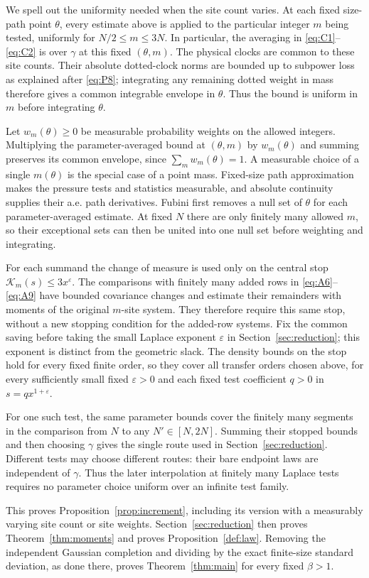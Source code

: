We spell out the uniformity needed when the site count varies.  At
each fixed size-path point \(\theta\), every estimate above is
applied to the particular integer \(m\) being tested, uniformly for
\(N/2\le m\le3N\).  In particular, the averaging in
\eqref{eq:C1}--\eqref{eq:C2} is over \(\gamma\) at this fixed
\((\theta,m)\).  The physical clocks are common to these site
counts.  Their absolute dotted-clock norms are bounded up to subpower
loss as explained after \eqref{eq:P8}; integrating any remaining
dotted weight in mass therefore gives a common integrable envelope
in \(\theta\).  Thus the bound is uniform in \(m\) before
integrating \(\theta\).

Let \(w_m(\theta)\ge0\) be measurable probability weights on the
allowed integers.  Multiplying the parameter-averaged bound at
\((\theta,m)\) by \(w_m(\theta)\) and summing preserves its
common envelope, since \(\sum_m w_m(\theta)=1\).  A measurable
choice of a single \(m(\theta)\) is the special case of a point
mass.  Fixed-size path approximation makes the pressure tests and
statistics measurable, and absolute continuity supplies their a.e.
path derivatives.  Fubini first removes a null set of \(\theta\)
for each parameter-averaged estimate.  At fixed \(N\) there are only
finitely many allowed \(m\), so their exceptional sets can then be
united into one null set before weighting and integrating.

For each summand the change of measure is used only on the central
stop \(\mathcal K_m(s)\le3x^\varepsilon\).  The comparisons with
finitely many added rows in \eqref{eq:A6}--\eqref{eq:A9} have bounded
covariance changes and estimate their remainders with moments of the
original \(m\)-site system.  They therefore require this same stop,
without a new stopping condition for the added-row systems.  Fix the
common saving before taking the small Laplace exponent
\(\varepsilon\) in Section~\ref{sec:reduction}; this exponent is
distinct from the geometric slack. The density bounds on the stop hold
for every fixed finite order, so they cover all transfer orders chosen
above, for every sufficiently small fixed \(\varepsilon>0\) and each
fixed test coefficient \(q>0\) in \(s=qx^{1+\varepsilon}\).

For one such test, the same parameter bounds cover the finitely many
segments in the comparison from \(N\) to any \(N'\in[N,2N]\).
Summing their stopped bounds and then choosing \(\gamma\) gives the
single route used in Section~\ref{sec:reduction}. Different tests may
choose different routes: their bare endpoint laws are independent of
\(\gamma\). Thus the later interpolation at finitely many Laplace
tests requires no parameter choice uniform over an infinite test family.

This proves Proposition~\ref{prop:increment}, including its version
with a measurably varying site count or site weights.
Section~\ref{sec:reduction} then proves Theorem~\ref{thm:moments}
and proves Proposition~\ref{def:law}.  Removing the independent
Gaussian completion and dividing by the exact finite-size standard
deviation, as done there, proves Theorem~\ref{thm:main} for every
fixed \(\beta>1\).
